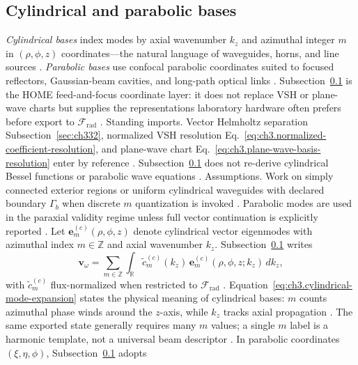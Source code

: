 \subsection{Cylindrical and parabolic bases}
\label{sec:ch382}
\emph{Cylindrical bases} index modes by axial wavenumber \(k_{z}\) and azimuthal integer \(m\) in
\((\rho,\phi,z)\) coordinates---the natural language of waveguides, horns, and line sources
\cite{stratton1941}. \emph{Parabolic bases} use confocal parabolic coordinates suited to
focused reflectors, Gaussian-beam cavities, and long-path optical links \cite{stratton1941}. Subsection~\ref{sec:ch382}
is the HOME feed-and-focus coordinate layer: it does not replace VSH or plane-wave charts but supplies the representations
laboratory hardware often prefers before export to \(\mathcal{F}_{\mathrm{rad}}\) \cite{hansen1988}.
Standing imports. Vector Helmholtz separation Subsection~\ref{sec:ch332}, normalized VSH resolution
Eq.~\eqref{eq:ch3.normalized-coefficient-resolution}, and plane-wave chart Eq.~\eqref{eq:ch3.plane-wave-basis-resolution} enter by
reference \cite{stratton1941}. Subsection~\ref{sec:ch382} does not re-derive cylindrical Bessel functions or parabolic
wave equations \cite{jackson1999}.
Assumptions. Work on simply connected exterior regions or uniform cylindrical waveguides with declared boundary \(\Gamma_{b}\) when
discrete \(m\) quantization is invoked \cite{stratton1941}. Parabolic modes are used in the paraxial
validity regime unless full vector continuation is explicitly reported \cite{jackson1999}.
Let \(\mathbf{e}_{m}^{(c)}(\rho,\phi,z)\) denote cylindrical vector eigenmodes with azimuthal index \(m\in\mathbb{Z}\) and axial
wavenumber \(k_{z}\). Subsection~\ref{sec:ch382} writes
\begin{equation}
\label{eq:ch3.cylindrical-mode-expansion}
\mathbf{v}_\omega
=
\sum_{m\in\mathbb{Z}}
\int_{\mathbb{R}}
\widetilde{c}_{m}^{(c)}(k_{z})\,
\mathbf{e}_{m}^{(c)}(\rho,\phi,z;k_{z})\,dk_{z},
\end{equation}
with \(\widetilde{c}_{m}^{(c)}\) flux-normalized when restricted to \(\mathcal{F}_{\mathrm{rad}}\)
\cite{stratton1941}. Equation~\eqref{eq:ch3.cylindrical-mode-expansion} states the physical meaning of
cylindrical bases: \(m\) counts azimuthal phase winds around the \(z\)-axis, while \(k_{z}\) tracks axial propagation
\cite{jackson1999}. The same exported state generally requires many \(m\) values; a single \(m\) label is a
harmonic template, not a universal beam descriptor \cite{hansen1988}.
In parabolic coordinates \((\xi,\eta,\phi)\), Subsection~\ref{sec:ch382} adopts
